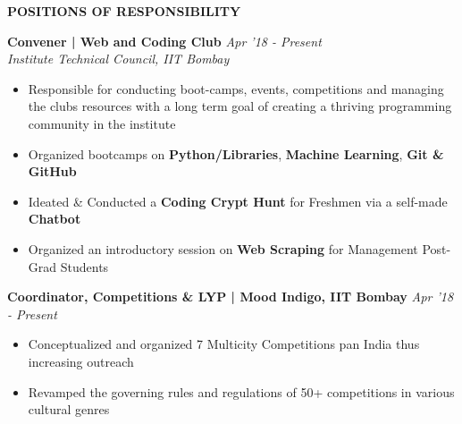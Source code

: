 \documentclass[11pt]{article}%
\begin{document}
\begin{flushleft}
\bf{\LARGE{P}\Large{OSITIONS} \LARGE{O}\Large{F} \LARGE{R}\Large{ESPONSIBILITY}}
\vspace{-3mm}
\end{flushleft}
\vspace{-4mm}
\hrulefill
\vspace{-0.2cm}
{\flushleft \bf \large{Convener | Web and Coding Club}} \hfill {{{\em {Apr '18 - Present}}}}\\{\em{Institute Technical Council, IIT Bombay}}
\begin{itemize}
\setlength\itemsep{0.01em}
\vspace{-0.3cm}
\item Responsible for conducting boot-camps, events, competitions and managing the club\textsc{}s resources with a 
long term goal of creating a thriving programming community in the institute
\vspace{-1.2mm}
\item Organized bootcamps on {\bf Python/Libraries}, {\bf Machine Learning}, {\bf Git \& GitHub}
\vspace{-1.2mm}
\item Ideated \& Conducted a {\bf Coding Crypt Hunt} for Freshmen via a self-made {\bf Chatbot}
\vspace{-1.2mm}
\item Organized an introductory session on {\bf Web Scraping} for Management Post-Grad Students
\end{itemize}
\vspace{-1mm}
\vspace{-5mm}
{\flushleft \bf \large{Coordinator, Competitions \& LYP | Mood Indigo, IIT Bombay}} \hfill {{{\em {Apr '18 - Present}}}}
\begin{itemize}
\setlength\itemsep{0.01em}
\vspace{-0.2cm}
\item Conceptualized and organized 7 Multicity Competitions pan India thus increasing outreach
\vspace{-1.2mm}
\item Revamped the governing rules and regulations of 50+ competitions in various cultural genres
\end{itemize}
\vspace{-5mm}
\end{document}

